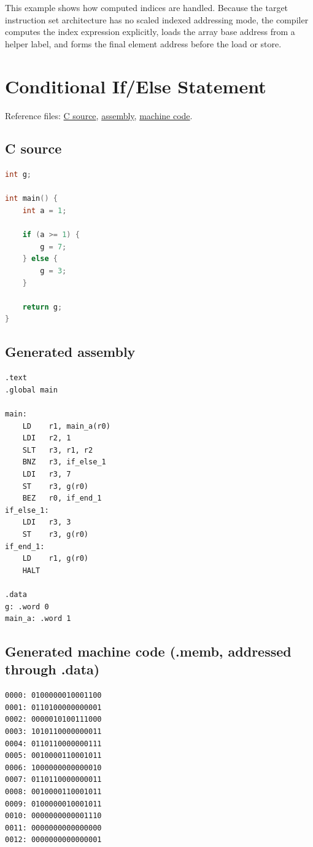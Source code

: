 \documentclass[12pt]{report}
\begin{document}
This example shows how computed indices are handled. Because the target instruction set architecture has no scaled indexed addressing mode, the compiler computes the index expression explicitly, loads the array base address from a helper label, and forms the final element address before the load or store.

\section{Conditional If/Else Statement}
Reference files:
\href{https://github.com/shorewind/Custom-ISA-Toolchain/blob/main/tests/feature-check/control-flow/if-else-geq.c}{C source},
\href{https://github.com/shorewind/Custom-ISA-Toolchain/blob/main/tests/feature-check/control-flow/if-else-geq.s}{assembly},
\href{https://github.com/shorewind/Custom-ISA-Toolchain/blob/main/tests/feature-check/control-flow/if-else-geq.memb}{machine code}.

\subsection*{C source}
\begin{lstlisting}[language=C]
int g;

int main() {
    int a = 1;

    if (a >= 1) {
        g = 7;
    } else {
        g = 3;
    }

    return g;
}
\end{lstlisting}

\subsection*{Generated assembly}
\begin{lstlisting}[language=CustomISAAsm]
.text
.global main

main:
    LD    r1, main_a(r0)
    LDI   r2, 1
    SLT   r3, r1, r2
    BNZ   r3, if_else_1
    LDI   r3, 7
    ST    r3, g(r0)
    BEZ   r0, if_end_1
if_else_1:
    LDI   r3, 3
    ST    r3, g(r0)
if_end_1:
    LD    r1, g(r0)
    HALT

.data
g: .word 0
main_a: .word 1
\end{lstlisting}

\subsection*{Generated machine code (.memb, addressed through .data)}
\begin{lstlisting}
0000: 0100000010001100
0001: 0110100000000001
0002: 0000010100111000
0003: 1010110000000011
0004: 0110110000000111
0005: 0010000110001011
0006: 1000000000000010
0007: 0110110000000011
0008: 0010000110001011
0009: 0100000010001011
0010: 0000000000001110
0011: 0000000000000000
0012: 0000000000000001
\end{lstlisting}
\end{document}
